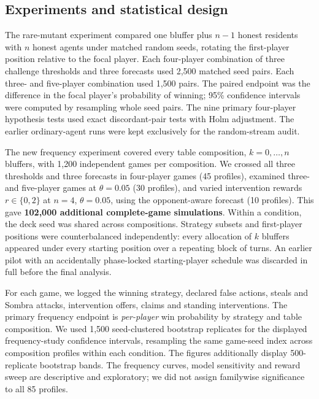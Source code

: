 \documentclass[11pt,a4paper]{article}
\begin{document}
\subsection{Experiments and statistical design}
The rare-mutant experiment compared one bluffer plus $n-1$ honest residents with $n$ honest agents under matched random seeds, rotating the first-player position relative to the focal player. Each four-player combination of three challenge thresholds and three forecasts used 2,500 matched seed pairs. Each three- and five-player combination used 1,500 pairs. The paired endpoint was the difference in the focal player's probability of winning; 95\% confidence intervals were computed by resampling whole seed pairs. The nine primary four-player hypothesis tests used exact discordant-pair tests with Holm adjustment. The earlier ordinary-agent runs were kept exclusively for the random-stream audit.

The new frequency experiment covered every table composition, $k=0,\ldots,n$ bluffers, with 1,200 independent games per composition. We crossed all three thresholds and three forecasts in four-player games (45 profiles), examined three- and five-player games at $\theta=0.05$ (30 profiles), and varied intervention rewards $r\in\{0,2\}$ at $n=4$, $\theta=0.05$, using the opponent-aware forecast (10 profiles). This gave \textbf{102,000 additional complete-game simulations}. Within a condition, the deck seed was shared across compositions. Strategy subsets and first-player positions were counterbalanced independently: every allocation of $k$ bluffers appeared under every starting position over a repeating block of turns. An earlier pilot with an accidentally phase-locked starting-player schedule was discarded in full before the final analysis.

For each game, we logged the winning strategy, declared false actions, steals and Sombra attacks, intervention offers, claims and standing interventions. The primary frequency endpoint is \emph{per-player} win probability by strategy and table composition. We used 1,500 seed-clustered bootstrap replicates for the displayed frequency-study confidence intervals, resampling the same game-seed index across composition profiles within each condition. The figures additionally display 500-replicate bootstrap bands. The frequency curves, model sensitivity and reward sweep are descriptive and exploratory; we did not assign familywise significance to all 85 profiles.
\end{document}
